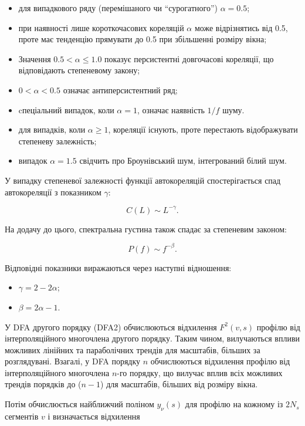 \documentclass[
  letterpaper,
]{report}
\providecommand{\tightlist}{%
  \setlength{\itemsep}{0pt}\setlength{\parskip}{0pt}}\usepackage{longtable,booktabs,array}
\begin{document}
\begin{itemize}
\tightlist
\item
  для випадкового ряду (перемішаного чи ``сурогатного'')
  \(\alpha = 0.5\);
\item
  при наявності лише короткочасових кореляцій \(\alpha\) може
  відрізнятись від 0.5, проте має тенденцію прямувати до 0.5 при
  збільшенні розміру вікна;
\item
  Значення \(0.5 < \alpha \leq 1.0\) показує персистентні довгочасові
  кореляції, що відповідають степеневому закону;
\item
  \(0 < \alpha < 0.5\) означає антиперсистентний ряд;
\item
  cпеціальний випадок, коли \(\alpha = 1\), означає наявність \(1/f\)
  шуму.
\item
  для випадків, коли \(\alpha \geq 1\), кореляції існують, проте
  перестають відображувати степеневу залежність;
\item
  випадок \(\alpha = 1.5\) свідчить про Броунівський шум, інтегрований
  білий шум.
\end{itemize}

У випадку степеневої залежності функції автокореляцій спостерігається
спад автокореляції з показником \(\gamma\):

\[
C(L) \sim L^{-\gamma}.
\]

На додачу до цього, спектральна густина також спадає за степеневим
законом:

\[
P(f) \sim f^{-\beta}. 
\]

Відповідні показники виражаються через наступні відношення:

\begin{itemize}
\tightlist
\item
  \(\gamma=2-2\alpha\);
\item
  \(\beta=2\alpha-1\).
\end{itemize}

У DFA другого порядку (DFA2) обчислюються відхилення \(F^2(v,s)\)
профілю від інтерполяційного многочлена другого порядку. Таким чином,
вилучаються впливи можливих лінійних та параболічних трендів для
масштабів, більших за розглядувані. Взагалі, у DFA порядку \(n\)
обчислюються відхилення профілю від інтерполяційного многочлена \(n\)-го
порядку, що вилучає вплив всіх можливих трендів порядків до (\(n-1\))
для масштабів, більших від розміру вікна.

Потім обчислюється найближчий поліном \(y_{ν}(s)\) для профілю на
кожному із \(2N_s\) сегментів \(v\) і визначається відхилення
\end{document}
